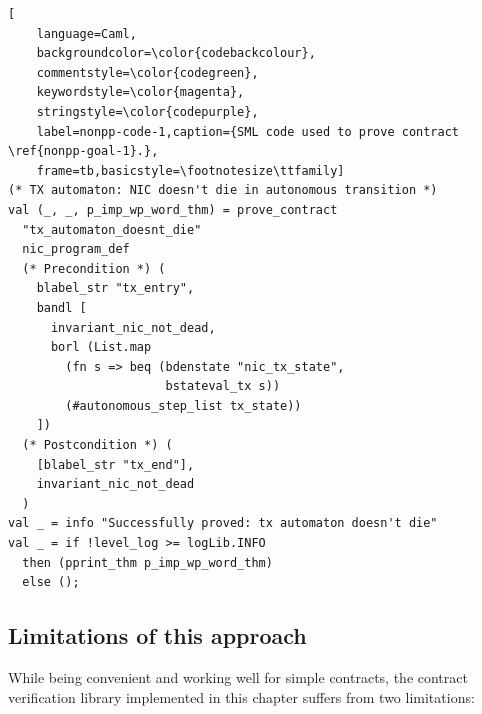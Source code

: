 \documentclass{kththesis}
\begin{document}
{\begin{lstlisting}[
    language=Caml,
    backgroundcolor=\color{codebackcolour},
    commentstyle=\color{codegreen},
    keywordstyle=\color{magenta},
    stringstyle=\color{codepurple},
    label=nonpp-code-1,caption={SML code used to prove contract \ref{nonpp-goal-1}.},
    frame=tb,basicstyle=\footnotesize\ttfamily]
(* TX automaton: NIC doesn't die in autonomous transition *)
val (_, _, p_imp_wp_word_thm) = prove_contract
  "tx_automaton_doesnt_die"
  nic_program_def
  (* Precondition *) (
    blabel_str "tx_entry",
    bandl [
      invariant_nic_not_dead,
      borl (List.map
        (fn s => beq (bdenstate "nic_tx_state",
                      bstateval_tx s))
        (#autonomous_step_list tx_state))
    ])
  (* Postcondition *) (
    [blabel_str "tx_end"],
    invariant_nic_not_dead
  )
val _ = info "Successfully proved: tx automaton doesn't die"
val _ = if !level_log >= logLib.INFO
  then (pprint_thm p_imp_wp_word_thm)
  else ();
\end{lstlisting}



\subsection{Limitations of this approach}

While being convenient and working well for simple contracts, the contract verification library implemented in this chapter suffers from two limitations:

}
\end{document}
